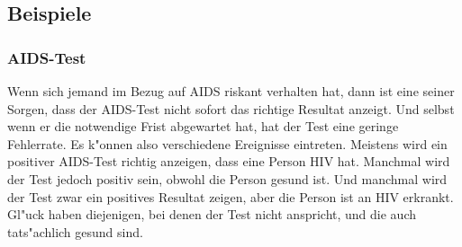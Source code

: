 \subsection{Beispiele}
\subsubsection{AIDS-Test}
Wenn sich jemand im Bezug auf AIDS riskant verhalten hat, dann ist
eine seiner Sorgen, dass der AIDS-Test nicht sofort das richtige
Resultat anzeigt. Und selbst wenn er die notwendige Frist abgewartet
hat, hat der Test eine geringe Fehlerrate.
Es k"onnen also verschiedene Ereignisse eintreten. Meistens wird ein
positiver AIDS-Test richtig anzeigen, dass eine Person HIV hat. Manchmal
wird der Test jedoch positiv sein, obwohl die Person gesund ist. Und manchmal
wird der Test zwar ein positives Resultat zeigen, aber die Person ist
an HIV erkrankt. Gl"uck haben diejenigen, bei denen der Test nicht
anspricht, und die auch tats"achlich gesund sind.


